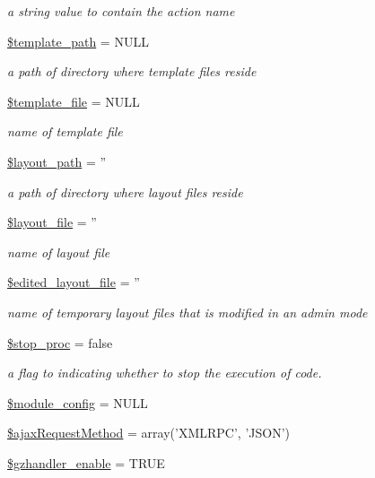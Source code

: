 \begin{DoxyCompactItemize}
\begin{DoxyCompactList}\small\item\em a string value to contain the action name \end{DoxyCompactList}\item 
\hyperlink{classModuleObject_a8a632bae853adef8e2ab9596a3a86661}{\$template\+\_\+path} = N\+U\+L\+L
\begin{DoxyCompactList}\small\item\em a path of directory where template files reside \end{DoxyCompactList}\item 
\hyperlink{classModuleObject_a6eddf08e627527affc7e835a6d302733}{\$template\+\_\+file} = N\+U\+L\+L
\begin{DoxyCompactList}\small\item\em name of template file \end{DoxyCompactList}\item 
\hyperlink{classModuleObject_ada660958e777413d332337fba67d657f}{\$layout\+\_\+path} = ''
\begin{DoxyCompactList}\small\item\em a path of directory where layout files reside \end{DoxyCompactList}\item 
\hyperlink{classModuleObject_a2a1677b06eb7b3ff04ff19e960a64e08}{\$layout\+\_\+file} = ''
\begin{DoxyCompactList}\small\item\em name of layout file \end{DoxyCompactList}\item 
\hyperlink{classModuleObject_a1fcbb01c627ce5ff104c05f54715bd61}{\$edited\+\_\+layout\+\_\+file} = ''
\begin{DoxyCompactList}\small\item\em name of temporary layout files that is modified in an admin mode \end{DoxyCompactList}\item 
\hyperlink{classModuleObject_ad4efa1b4c623247763e4d56f76c5fb1c}{\$stop\+\_\+proc} = false
\begin{DoxyCompactList}\small\item\em a flag to indicating whether to stop the execution of code. \end{DoxyCompactList}\item 
\hyperlink{classModuleObject_aed2cac16f365c2b463772e3eeb0c1402}{\$module\+\_\+config} = N\+U\+L\+L
\item 
\hyperlink{classModuleObject_a783d38cb68310dc6e5a1f6c1cc6c6b84}{\$ajax\+Request\+Method} = array('X\+M\+L\+R\+P\+C', 'J\+S\+O\+N')
\item 
\hyperlink{classModuleObject_acda88247a161a0ddf878e8f504909329}{\$gzhandler\+\_\+enable} = T\+R\+U\+E
\end{DoxyCompactItemize}


